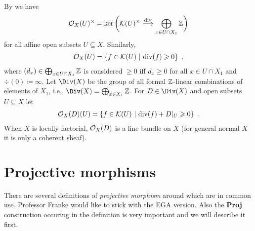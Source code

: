 \documentclass[a4paper,parskip=half,numbers=enddot, DIV=12]{scrreprt}
\renewcommand{\geq}{\geqslant}
\begin{document}
By  we have
\begin{align*}
	\Oo_X(U)^\times =\ker\bigg(\Kk(U)^\times\morphism[\div]\bigoplus_{x\in U\cap X_1}\IZ\bigg)
\end{align*}
for all affine open subsets $U\subseteq X$. Similarly,
\begin{align*}
	\Oo_X(U)=\left\{f\in\Kk(U)\st \div(f)\geq 0\right\}\;,
\end{align*}
where $(d_x)\in \bigoplus_{x\in U\cap X_1}\mathbb{Z}$ is considered $\geq 0$ iff $d_x\geq 0$ for all $x\in U\cap X_1$ and $\div(0)\coloneqq\infty$. Let $\Div(X)$ be the group of all formal $\mathbb{Z}$-linear combinations of elements of $X_1$, i.e., $\Div(X)=\bigoplus_{x\in X_1}\IZ$. For $D\in\Div(X)$ and open subsets $U\subseteq X$ let
\begin{align*}
	\Oo_X(D)(U)=\left\{f\in\Kk(U)\st\div(f)+D|_U\geq 0\right\}\;.
\end{align*}
When $X$ is locally factorial, $\mathcal{O}_X(D)$ is a line bundle on $X$ (for general normal $X$ it is only a coherent sheaf).

\section{Projective morphisms}
There are several definitions of \emph{projective morphism} around which are in common use. Professor Franke would like to stick with the EGA version. Also the $\operatorname{\mathbf{Proj}}$ construction occuring in the definition is very important and we will describe it first.
\end{document}
